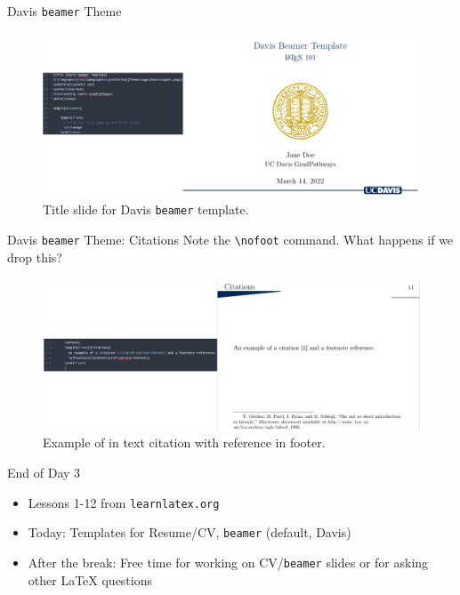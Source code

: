 \documentclass{beamer}
\begin{document}
{  \begin{frame}{Davis \texttt{beamer} Theme}
    \begin{figure}
      \includegraphics[width=\linewidth]{day03-07B-davistitle.png}
      \caption{Title slide for Davis \texttt{beamer} template.}
      \label{fig:day03-07B-davistitle}
    \end{figure}
  \end{frame}

  \begin{frame}{Davis \texttt{beamer} Theme: Citations}
    Note the \texttt{\textbackslash nofoot} command. What happens if we drop this?
    \begin{figure}
      \includegraphics[width=\linewidth]{day03-07C-davisfootcite.png}
      \caption{Example of in text citation with reference in footer.}
      \label{fig:day03-07C-davisfootcite}
    \end{figure}
  \end{frame}

  \begin{frame}{End of Day 3}
    \begin{itemize}
      \item Lessons 1-12 from \texttt{learnlatex.org}
      \item Today: Templates for Resume/CV, \texttt{beamer} (default, Davis)
      \item After the break: Free time for working on CV/\texttt{beamer} slides or for asking other \LaTeX{} questions
    \end{itemize}
  \end{frame}

%   
%   

} %
\end{document}
